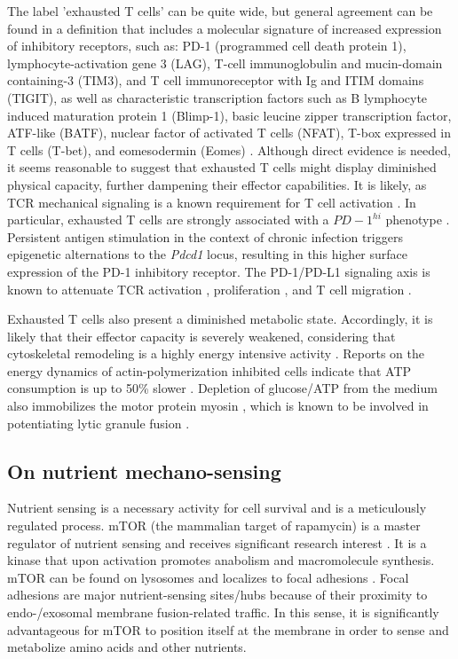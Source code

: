 The label 'exhausted T cells' can be quite wide, but general agreement can be found in a definition that includes a molecular signature of increased expression of inhibitory receptors, such as: PD-1 (programmed cell death protein 1), lymphocyte-activation gene 3 (LAG), T-cell immunoglobulin and mucin-domain containing-3 (TIM3), and T cell immunoreceptor with Ig and ITIM domains (TIGIT), as well as characteristic transcription factors such as B lymphocyte induced maturation protein 1 (Blimp-1), basic leucine zipper transcription factor, ATF-like (BATF), nuclear factor of activated T cells (NFAT), T-box expressed in T cells (T-bet), and eomesodermin (Eomes) \cite{Wherry2011, Quigley2010, Keir2008, Doering2012, Wherry2007, Wang2012,  Lazarevic2013, Rangachari2012, Shin2009, Paley2012, Larsson2013}. Although direct evidence is needed, it seems reasonable to suggest that exhausted T cells might display diminished physical capacity, further dampening their effector capabilities. It is likely, as TCR mechanical signaling is a known requirement for T cell activation \cite{Hu2016}. In particular, exhausted T cells are strongly associated with a $PD-1^{hi}$ phenotype \cite{Keir2008}. Persistent antigen stimulation in the context of chronic infection triggers epigenetic alternations to the \textit{Pdcd1} locus, resulting in this higher surface expression of the PD-1 inhibitory receptor. The PD-1/PD-L1 signaling axis is known to attenuate TCR activation \cite{Mizuno2019}, proliferation \cite{Schietinger2014}, and T cell migration \cite{Zinselmeyer2013}. 

Exhausted T cells also present a diminished metabolic state. Accordingly, it is likely that their effector capacity is severely weakened, considering that cytoskeletal remodeling is a highly energy intensive activity \cite{Bernstein2002}. Reports on the energy dynamics of actin-polymerization inhibited cells indicate that ATP consumption is up to 50\% slower \cite{Bernstein2002, Ahmed2015}. Depletion of glucose/ATP from the medium also immobilizes the motor protein myosin \cite{Xu2014}, which is known to be involved in potentiating lytic granule fusion \cite{Basu2016}.

\subsection{On nutrient mechano-sensing}

Nutrient sensing is a necessary activity for cell survival and is a meticulously regulated process. mTOR (the mammalian target of rapamycin) is a master regulator of nutrient sensing and receives significant research interest \cite{Park2020}. It is a kinase that upon activation promotes anabolism and macromolecule synthesis. mTOR can be found on lysosomes \cite{Rabanal-Ruiz2018} and localizes to focal adhesions \cite{Rabanal-Ruiz2018}. Focal adhesions are major nutrient-sensing sites/hubs \cite{Hamidi2021} because of their proximity to  endo-/exosomal membrane fusion-related traffic. In this sense, it is significantly advantageous for mTOR to position itself at the membrane in order to sense and metabolize amino acids \cite{Shimobayashi2016} and other nutrients.

